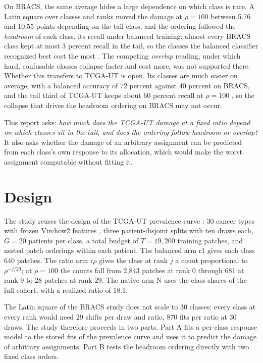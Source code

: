 \documentclass[11pt]{article}
\begin{document}
On BRACS, the same average hides a large dependence on which class is rare. A Latin square over classes and ranks moved the damage at $\rho=100$ between 5.76 and 10.55 points depending on the tail class, and the ordering followed the \emph{headroom} of each class, its recall under balanced training: almost every BRACS class kept at most 3 percent recall in the tail, so the classes the balanced classifier recognized best cost the most \citep{queisler2026tailBracs}. The competing \emph{overlap} reading, under which hard, confusable classes collapse faster and cost more, was not supported there. Whether this transfers to TCGA-UT is open. Its classes are much easier on average, with a balanced accuracy of 72 percent against 40 percent on BRACS, and the tail third of TCGA-UT keeps about 60 percent recall at $\rho=100$ \citep{queisler2026prevalenceTcga}, so the collapse that drives the headroom ordering on BRACS may not occur.

This report asks: \emph{how much does the TCGA-UT damage at a fixed ratio depend on which classes sit in the tail, and does the ordering follow headroom or overlap?} It also asks whether the damage of an arbitrary assignment can be predicted from each class's own response to its allocation, which would make the worst assignment computable without fitting it.

\section{Design}
\label{sec:design}
The study reuses the design of the TCGA-UT prevalence curve \citep{queisler2026prevalenceTcga}: 30 cancer types with frozen Virchow2 features \citep{zimmermann2024virchow2}, three patient-disjoint splits with ten draws each, $G=20$ patients per class, a total budget of $T=19{,}200$ training patches, and nested patch orderings within each patient. The balanced arm r1 gives each class 640 patches. The ratio arm r$\rho$ gives the class at rank $j$ a count proportional to $\rho^{-j/29}$; at $\rho=100$ the counts fall from 2,843 patches at rank 0 through 681 at rank 9 to 28 patches at rank 29. The native arm N uses the class shares of the full cohort, with a realized ratio of 18.1.

The Latin square of the BRACS study does not scale to 30 classes: every class at every rank would need 29 shifts per draw and ratio, 870 fits per ratio at 30 draws. The study therefore proceeds in two parts. Part A fits a per-class response model to the stored fits of the prevalence curve and uses it to predict the damage of arbitrary assignments. Part B tests the headroom ordering directly with two fixed class orders.
\end{document}
